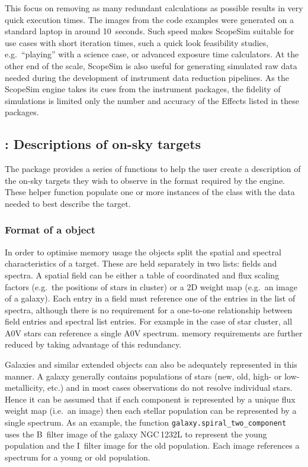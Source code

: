 This focus on removing as many redundant calculations as possible results in very quick execution times.
The images from the code examples were generated on a standard laptop in around 10~seconds.
Such speed makes ScopeSim suitable for use cases with short iteration times, such a quick look feasibility studies, e.g.~``playing'' with a science case, or advanced exposure time calculators.
At the other end of the scale, ScopeSim is also useful for generating simulated raw data needed during the development of instrument data reduction pipelines.
As the ScopeSim engine takes its cues from the instrument packages, the fidelity of simulations is limited only the number and accuracy of the Effects listed in these packages.


\subsection{\ScopeSimtemplates{}: Descriptions of on-sky targets}
\label{scopesim-templates-descriptions-of-on-sky-targets}

The \scopesimtemplates{} package provides a series of functions to help the user create a description of the on-sky targets they wish to observe in the format required by the \ScopeSim{} engine.
These helper function populate one or more instances of the \ScopeSim{} \Source{} class with the data needed to best describe the target.


\subsubsection{Format of a \Source{} object}
\label{format-of-a-source-object}

In order to optimise memory usage the \Source{} objects split the spatial and spectral characteristics of a target.\cite{schmalzl2012}
These are held separately in two lists: fields and spectra.
A spatial field can be either a table of coordinated and flux scaling factors (e.g.~the positions of stars in cluster) or a 2D weight map (e.g.~an image of a galaxy).
Each entry in a field must reference one of the entries in the list of spectra, although there is no requirement for a one-to-one relationship between field entries and spectral list entries.
For example in the case of star cluster, all A0V stars can reference a single A0V spectrum.
\ScopeSim{} memory requirements are further reduced by taking advantage of this redundancy.

Galaxies and similar extended objects can also be adequately represented in this manner.
A galaxy generally contains populations of stars (new, old, high- or low-metallicity, etc.) and in most cases observations do not resolve individual stars.
Hence it can be assumed that if each component is represented by a unique flux weight map (i.e.~an image) then each stellar population can be represented by a single spectrum.
As an example, the \scopesimtemplates{} function \lstinline{galaxy.spiral_two_component} uses the B~filter image of the galaxy NGC\,1232L to represent the young population and the I~filter image for the old population.
Each image references a spectrum for a young or old population.

